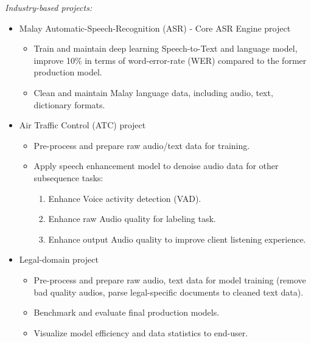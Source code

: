 \documentclass[10pt]{article}
\begin{document}
        \vspace{-5mm}
        \emph{Industry-based projects:}
        \vspace{-2.5mm}

        \begin{itemize}[noitemsep]
        \item Malay Automatic-Speech-Recognition (ASR) - Core ASR Engine project
            \begin{itemize}[noitemsep]
                \item Train and maintain deep learning Speech-to-Text and language model, improve 10\% in terms of word-error-rate (WER) compared to the former production model.
                \item Clean and maintain Malay language data, including audio, text, dictionary formats.
            \end{itemize}
        \item Air Traffic Control (ATC) project
            \begin{itemize}[noitemsep]
                \item Pre-process and prepare raw audio/text data for training.
                \item Apply speech enhancement model to denoise audio data for other subsequence tasks:
                    \begin{enumerate}[noitemsep]
                        \item Enhance Voice activity detection (VAD).
                        \item Enhance raw Audio quality for labeling task.
                        \item Enhance output Audio quality to improve client listening experience.
                    \end{enumerate}
            \end{itemize}
        \item Legal-domain project
            \begin{itemize}[noitemsep]
                \item Pre-process and prepare raw audio, text data for model training (remove bad quality audios, parse legal-specific documents to cleaned text data).
                \item Benchmark and evaluate final production models.
                \item Visualize model efficiency and data statistics to end-user.
            \end{itemize}
        \end{itemize}
\end{document}
